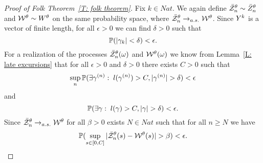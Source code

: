 \begin{proof}[Proof of Folk Theorem~\ref{T: folk theorem}]
	Fix $k \in Nat$. 
	We again define $\bar{\mathcal{Z}}^{\theta}_n \sim \bar{Z}^{\theta}_n$ and $\mathcal{W}^{\theta} \sim W^{\theta}$ on the same probability space,
	where $\bar{\mathcal{Z}}^{\theta}_n \rightarrow_{a.s.} \mathcal{W}^{\theta}$.
	Since ${Y}^k$ is a vector of finite length, for all $\epsilon > 0$ we can find $\delta > 0$ such that
	\begin{equation} \label{E: folk theorem cond bm1}
		\mathbb{P}(|\gamma_k| < \delta) < \epsilon.
	\end{equation}
	For a realization of the processes $\bar{\mathcal{Z}}^{\theta}_n(\omega)$ and $\mathcal{W}^{\theta}(\omega)$ we know from Lemma~\ref{L: late excursions}
	that for all $\epsilon> 0$ and $\delta > 0$ there exists $C > 0$ such that
	\begin{equation} \label{E: folk theorem cond znt}
		\sup_n \mathbb{P}( \exists \gamma^{(n)}: \; l(\gamma^{(n)}) > C, |\gamma^{(n)}| > \delta ) < \epsilon
	\end{equation}
	and
	\begin{equation} \label{E: folk theorem cond bm2}
		\mathbb{P}(\exists \gamma: \; l(\gamma) > C, |\gamma| > \delta) < \epsilon.
	\end{equation}
	Since $\bar{\mathcal{Z}}^{\theta}_n \rightarrow_{a.s.} \mathcal{W}^{\theta}$ for all $\beta > 0$ exists $N \in Nat$ such that for all $n \geq N$ we have
	\begin{equation} \label{E: folk theorem cond sup}
		\mathbb{P}( \sup_{s \in [0, C]} |\bar{\mathcal{Z}}^{\theta}_n(s) - \mathcal{W}^{\theta}(s)| > \beta ) < \epsilon.
	\end{equation}
	

\end{proof}
